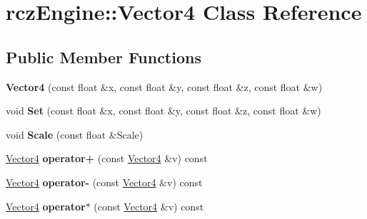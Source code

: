 \hypertarget{classrcz_engine_1_1_vector4}{}\section{rcz\+Engine\+:\+:Vector4 Class Reference}
\label{classrcz_engine_1_1_vector4}
\subsection*{Public Member Functions}
\begin{DoxyCompactItemize}
\item 
\hypertarget{classrcz_engine_1_1_vector4_a77fa30fd86b87d12b44e0528e68f9410}{}{\bfseries Vector4} (const float \&x, const float \&y, const float \&z, const float \&w)\label{classrcz_engine_1_1_vector4_a77fa30fd86b87d12b44e0528e68f9410}

\item 
\hypertarget{classrcz_engine_1_1_vector4_a140144077dd60dffebe8e9533500a494}{}void {\bfseries Set} (const float \&x, const float \&y, const float \&z, const float \&w)\label{classrcz_engine_1_1_vector4_a140144077dd60dffebe8e9533500a494}

\item 
\hypertarget{classrcz_engine_1_1_vector4_a61e04d0d6ddfa5c8cc54702016851296}{}void {\bfseries Scale} (const float \&Scale)\label{classrcz_engine_1_1_vector4_a61e04d0d6ddfa5c8cc54702016851296}

\item 
\hypertarget{classrcz_engine_1_1_vector4_ace546cec9c27fe56ea2e1d96390ea83c}{}\hyperlink{classrcz_engine_1_1_vector4}{Vector4} {\bfseries operator+} (const \hyperlink{classrcz_engine_1_1_vector4}{Vector4} \&v) const \label{classrcz_engine_1_1_vector4_ace546cec9c27fe56ea2e1d96390ea83c}

\item 
\hypertarget{classrcz_engine_1_1_vector4_a3bfd3c68c0b3f5bac2460886a93dbc23}{}\hyperlink{classrcz_engine_1_1_vector4}{Vector4} {\bfseries operator-\/} (const \hyperlink{classrcz_engine_1_1_vector4}{Vector4} \&v) const \label{classrcz_engine_1_1_vector4_a3bfd3c68c0b3f5bac2460886a93dbc23}

\item 
\hypertarget{classrcz_engine_1_1_vector4_af182ab35165c70813469b4d0ed9089de}{}\hyperlink{classrcz_engine_1_1_vector4}{Vector4} {\bfseries operator$\ast$} (const \hyperlink{classrcz_engine_1_1_vector4}{Vector4} \&v) const \label{classrcz_engine_1_1_vector4_af182ab35165c70813469b4d0ed9089de}


\end{DoxyCompactItemize}
